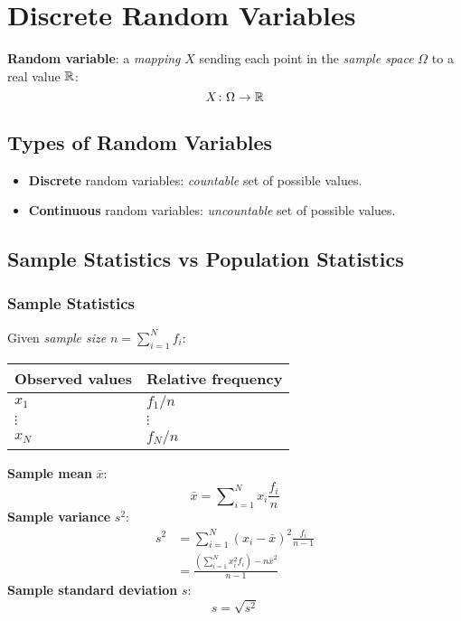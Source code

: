 \section*{Discrete Random Variables}

\textbf{Random variable}: a \textit{mapping} $X$ sending each point in the \textit{sample space} $\Omega$ to a real value $\mathbb{R}$:
\begin{equation*}
    X \colon \Omega \to \mathbb{R}
\end{equation*}

\subsection*{Types of Random Variables}

\begin{itemize}
    \item \textbf{Discrete} random variables: \textit{countable} set of possible values.
    \item \textbf{Continuous} random variables: \textit{uncountable} set of possible values.
\end{itemize}

\subsection*{Sample Statistics vs Population Statistics}

\subsubsection*{Sample Statistics}

Given \textit{sample size} $n = \sum \nolimits_{i = 1}^{N} f_i$:
\begin{table}[H]
    \centering
    \begin{tabularx}{\linewidth}{@{}Y|Y@{}}
        \toprule
        Observed values & Relative frequency \\
        \midrule
        $x_1$ & $f_1 / n$ \\
        $\vdots$ & $\vdots$ \\
        $x_N$ & $f_N / n$ \\
        \bottomrule
    \end{tabularx}
\end{table}
\textbf{Sample mean} $\bar{x}$:
\begin{equation*}
    \bar{x} = \sum \nolimits_{i = 1}^{N} x_i \frac{f_i}{n}
\end{equation*}
\textbf{Sample variance} $s^2$:
\begin{align*}
    s^2
    &= \sum \nolimits_{i = 1}^{N} (x_i - \bar{x})^2 \frac{f_i}{n - 1} \\
    &= \frac{ \left( \sum \nolimits_{i = 1}^{N} x_i^2 f_i \right) - n \bar{x}^2 }{n - 1}
\end{align*}
\textbf{Sample standard deviation} $s$:
\begin{equation*}
    s = \sqrt{s^2}
\end{equation*}

